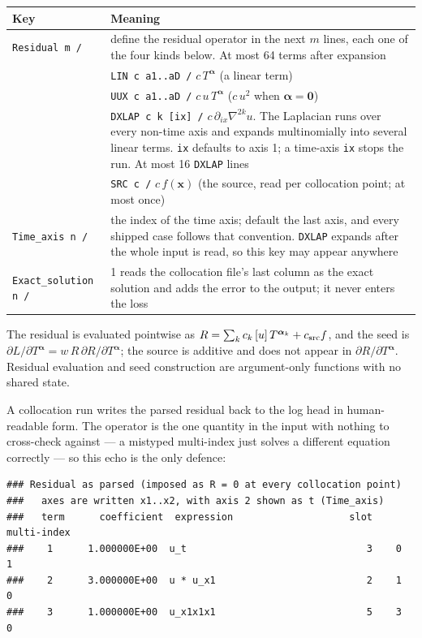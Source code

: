 \documentclass[10pt,a4paper]{article}
\newcommand{\code}[1]{\texttt{#1}}
\newcommand{\mi}[1]{\boldsymbol{#1}}
\begin{document}
\begin{longtable}{@{}p{}p{}@{}}
\toprule
Key & Meaning \\
\midrule
\endhead
\code{Residual m /} & define the residual operator in the next $m$ lines, each one of the four kinds below. At most 64 terms after expansion\\
 & \quad \code{LIN c a1..aD /} \quad $c\,T^{\mi\alpha}$ (a linear term)\\
 & \quad \code{UUX c a1..aD /} \quad $c\,u\,T^{\mi\alpha}$ ($c\,u^2$ when $\mi\alpha=\mi0$)\\
 & \quad \code{DXLAP c k [ix] /} \quad $c\,\partial_{ix}\nabla^{2k}u$. The Laplacian runs over every non-time axis and expands multinomially into several linear terms. \code{ix} defaults to axis 1; a time-axis \code{ix} stops the run. At most 16 \code{DXLAP} lines\\
 & \quad \code{SRC c /} \quad $c\,f(\mi{x})$ (the source, read per collocation point; at most once)\\
\code{Time\_axis n /} & the index of the time axis; default the last axis, and every shipped case follows that convention. \code{DXLAP} expands after the whole input is read, so this key may appear anywhere\\
\code{Exact\_solution n /} & 1 reads the collocation file's last column as the exact solution and adds the error to the output; it never enters the loss\\
\bottomrule
\end{longtable}

The residual is evaluated pointwise as
$R=\sum_k c_k\,[u]\,T^{\mi\alpha_k}+c_{\rm src}f$, and the seed is
$\partial L/\partial T^{\mi\alpha}= w\,R\,\partial R/\partial
T^{\mi\alpha}$; the source is additive and does not appear in
$\partial R/\partial T^{\mi\alpha}$. Residual evaluation and seed
construction are argument-only functions with no shared state.

A collocation run writes the parsed residual back to the log head in
human-readable form. The operator is the one quantity in the input
with nothing to cross-check against --- a mistyped multi-index just
solves a different equation correctly --- so this echo is the only
defence:

\begin{verbatim}
### Residual as parsed (imposed as R = 0 at every collocation point)
###   axes are written x1..x2, with axis 2 shown as t (Time_axis)
###   term      coefficient  expression                    slot  multi-index
###    1      1.000000E+00  u_t                               3    0  1
###    2      3.000000E+00  u * u_x1                          2    1  0
###    3      1.000000E+00  u_x1x1x1                          5    3  0
\end{verbatim}
\end{document}
